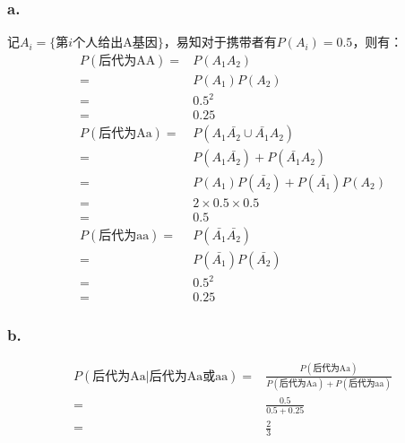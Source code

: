 \documentclass[a4paper,12pt]{ctexart}
\begin{document}
\subsubsection*{a.}
记$A_i=\{\text{第}i\text{个人给出A基因}\}$，易知对于携带者有$P(A_i) = 0.5$，则有：
\begin{align*}
	P(\text{后代为AA}) =& P(A_1A_2)\\
	=& P(A_1)P(A_2)\\
	=& 0.5^2\\
	=& 0.25\\
	P(\text{后代为Aa}) =& P(A_1\bar{A_2} \cup \bar{A_1}A_2)\\
	=& P(A_1\bar{A_2}) + P(\bar{A_1}A_2)\\
	=& P(A_1)P(\bar{A_2}) + P(\bar{A_1})P(A_2)\\
	=& 2\times 0.5\times 0.5\\
	=& 0.5\\
	P(\text{后代为aa}) =& P(\bar{A_1}\bar{A_2})\\
	=& P(\bar{A_1})P(\bar{A_2})\\
	=& 0.5^2\\
	=& 0.25
\end{align*}

\subsubsection*{b.}
\begin{align*}
	P(\text{后代为Aa}|\text{后代为Aa或aa}) =& \frac{P(\text{后代为Aa})}{P(\text{后代为Aa}) + P(\text{后代为aa})}\\
	=& \frac{0.5}{0.5 + 0.25}\\
	=& \frac{2}{3}
\end{align*}
\end{document}
